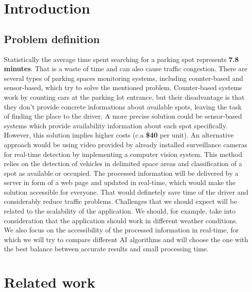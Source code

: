 \documentclass[runningheads,a4paper,11pt]{report}
\begin{document}
 


\chapter{Introduction}
\label{chapter:introduction}

\section{Problem definition}
\label{section:what}

Statistically the average time spent searching for a parking spot represents \textbf{7.8 minutes}.
That is a waste of time and can also cause traffic congestion. There are several types of 
parking spaces monitoring systems, including counter-based and sensor-based, which try to solve the mentioned problem.
Counter-based systems work by counting cars at the parking lot entrance, but their disadvantage is that they don't provide 
concrete informations about available spots, leaving the task of finding the place to the driver.
A more precise solution could be sensor-based systems which provide availability information about each 
spot specifically. However, this solution implies higher costs (c.a \textbf{\$40} per unit). 
An alternative approach would be using video provided by already installed surveillance cameras for real-time 
detection by implementing a computer vision system.
This method relies on the detection of vehicles in delimited space areas and classification of a spot as 
available or occupied. The processed information will be delivered by a server in form of a web page and updated 
in real-time, which would make the solution accessible for everyone. That would definetely save time of the driver 
and considerably reduce traffic problems.
Challenges that we should expect will be related to the scalability of the application. We should, for example, take into 
consideration that the application should work in different weather conditions. We also focus on the accessibility 
of the processed information in real-time, for which we will try to compare different AI algorithms and will choose 
the one with the best balance between accurate results and small processing time.

\chapter{Related work}
\label{chapter:stateOfArt}
\end{document}
